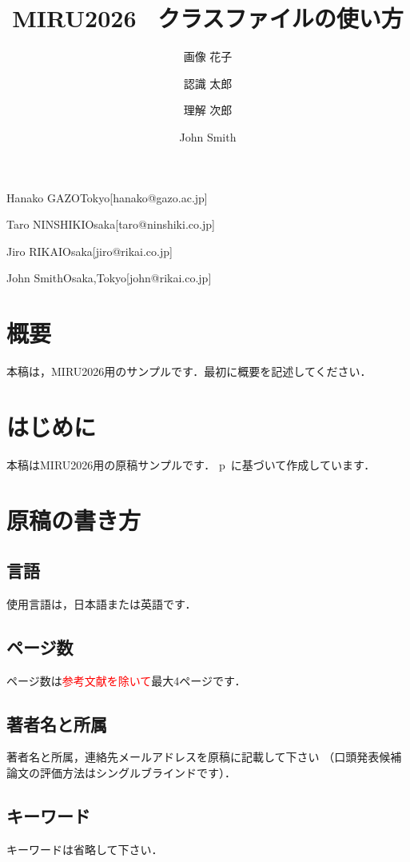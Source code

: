 \documentclass[MIRU,submit]{miru2026j}
\begin{document}
\title{MIRU2026 \LaTeXe\ クラスファイルの使い方}


 \author{画像 花子}{Hanako GAZO}{Tokyo}[hanako@gazo.ac.jp]
 \author{認識 太郎}{Taro NINSHIKI}{Osaka}[taro@ninshiki.co.jp]
 \author{理解 次郎}{Jiro RIKAI}{Osaka}[jiro@rikai.co.jp]
 \author{John Smith}{John Smith}{Osaka,Tokyo}[john@rikai.co.jp]


\maketitle

\section*{概要}
本稿は，MIRU2026用のサンプルです．最初に概要を記述してください．

\section{はじめに}
本稿はMIRU2026用の原稿サンプルです．
p\LaTeXe\ に基づいて作成しています．

\section{原稿の書き方}

\subsection{言語}
使用言語は，日本語または英語です．

\subsection{ページ数}
ページ数は\textcolor{red}{参考文献を除いて}最大4ページです．

\subsection{著者名と所属}
著者名と所属，連絡先メールアドレスを原稿に記載して下さい
（口頭発表候補論文の評価方法はシングルブラインドです）．

\subsection{キーワード}
キーワードは省略して下さい．
\end{document}
